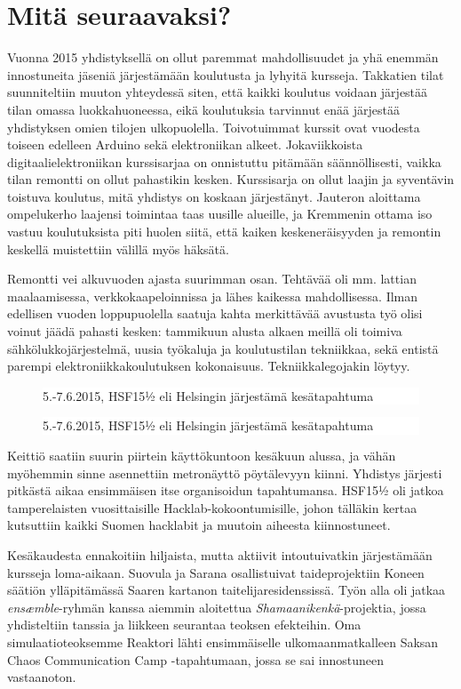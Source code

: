 \documentclass[a4paper]{memoir}
\newcommand{\varitys}{white}
\newlength{\aXa}
\newlength{\aXb}
\newcommand{\jana}[1]{
        \setlength{\aXa}{4cm}
        \setlength{\aXb}{0.4\textwidth}
   \ifodd\value{page}
        \begin{figure}\vspace{-7pt} \hspace{5pt} \colorbox{\varitys}{\parbox{\aXb}{   \textsf{{#1}}  }} \vspace{-7pt}\end{figure}
     \else
        \begin{figure}\vspace{-7pt}    \hspace{-5pt}  \colorbox{\varitys}{\parbox{\aXb}{   \textsf{{#1}} }} \vspace{-7pt}\end{figure}
     \fi
}
\begin{document}
\section*{Mitä seuraavaksi?}

Vuonna 2015 yhdistyksellä on ollut paremmat mahdollisuudet ja yhä enemmän innostuneita jäseniä järjestämään koulutusta ja lyhyitä kursseja. Takkatien tilat suunniteltiin muuton yhteydessä siten, että kaikki koulutus voidaan järjestää tilan omassa luokkahuoneessa, eikä koulutuksia tarvinnut enää järjestää yhdistyksen omien tilojen ulkopuolella. Toivotuimmat kurssit ovat vuodesta toiseen edelleen Arduino sekä elektroniikan alkeet. Jokaviikkoista digitaalielektroniikan kurssisarjaa on onnistuttu pitämään säännöllisesti, vaikka tilan remontti on ollut pahastikin kesken. Kurssisarja on ollut laajin ja syventävin toistuva koulutus, mitä yhdistys on koskaan järjestänyt. Jauteron aloittama ompelukerho laajensi toimintaa taas uusille alueille, ja Kremmenin ottama iso vastuu koulutuksista piti huolen siitä, että kaiken keskeneräisyyden ja remontin keskellä muistettiin välillä myös häksätä.

Remontti vei alkuvuoden ajasta suurimman osan. Tehtävää oli mm. lattian maalaamisessa, verkkokaapeloinnissa ja lähes kaikessa mahdollisessa. Ilman edellisen vuoden loppupuolella saatuja kahta merkittävää avustusta työ olisi voinut jäädä pahasti kesken: tammikuun alusta alkaen meillä oli toimiva sähkölukkojärjestelmä, uusia työkaluja ja koulutustilan tekniikkaa, sekä entistä parempi elektroniikkakoulutuksen kokonaisuus. Tekniikkalegojakin löytyy.

\jana{5.-7.6.2015, HSF15½ eli Helsingin järjestämä kesätapahtuma}

Keittiö saatiin suurin piirtein käyttökuntoon kesäkuun alussa, ja vähän myöhemmin sinne asennettiin metronäyttö pöytälevyyn kiinni. Yhdistys järjesti pitkästä aikaa ensimmäisen itse organisoidun tapahtumansa. HSF15½ oli jatkoa tamperelaisten vuosittaisille Hacklab-kokoontumisille, johon tälläkin kertaa kutsuttiin kaikki Suomen hacklabit ja muutoin aiheesta kiinnostuneet.

Kesäkaudesta ennakoitiin hiljaista, mutta aktiivit intoutuivatkin järjestämään kursseja loma-aikaan. Suovula ja Sarana osallistuivat taideprojektiin Koneen säätiön ylläpitämässä Saaren kartanon taitelijaresidenssissä. Työn alla oli jatkaa \textit{ensæmble}-ryhmän kanssa aiemmin aloitettua \textit{Shamaanikenkä}-projektia, jossa yhdisteltiin tanssia ja liikkeen seurantaa teoksen efekteihin. Oma simulaatioteoksemme Reaktori lähti ensimmäiselle ulkomaanmatkalleen Saksan Chaos Communication Camp -tapahtumaan, jossa se sai innostuneen vastaanoton.
\end{document}
